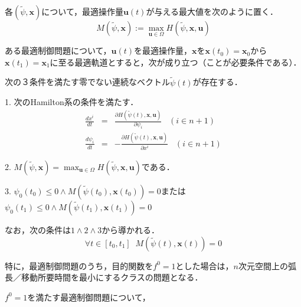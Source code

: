 \documentclass[uplatex,dvipdfmx]{jsreport}
\begin{document}
\begin{notation}
    各$(\tilde{\psi},\mathbf{x})$について，最適操作量$\mathbf{u}(t)$が与える最大値を次のように置く．
    \[ M(\tilde{\psi},\mathbf{x}):=\max_{\mathbf{u}\in\Omega}H(\tilde{\psi},\mathbf{x},\mathbf{u}) \]
\end{notation}

\begin{theorem}[Pontryagin]
    ある最適制御問題について，$\mathbf{u}(t)$を最適操作量，$\mathbf{x}$を$\mathbf{x}(t_0)=\mathbf{x}_0$から$\mathbf{x}(t_1)=\mathbf{x}_1$に至る最適軌道とすると，次が成り立つ（ことが必要条件である）．

    \begin{center}
        
        次の３条件を満たす零でない連続なベクトル$\tilde{\psi}(t)$が存在する．

    1. 次のHamilton系の条件を満たす．
    \begin{eqnarray}
        \frac{dx^i}{dt} &=& \frac{\partial H(\tilde{\psi}(t),\mathbf{x},\mathbf{u})}{\partial\psi_i}\;\;\; (i\in n+1) \\
        \frac{d\psi_i}{dt} &=& -\frac{\partial H(\tilde{\psi}(t),\mathbf{x},\mathbf{u})}{\partial x^i}\;\;\; (i\in n+1)
    \end{eqnarray}

    2. $M(\tilde{\psi},\mathbf{x})=\max_{\mathbf{u}\in\Omega}H(\tilde{\psi},\mathbf{x},\mathbf{u})$である．

    3. $\psi_0(t_0)\le 0\land M(\tilde{\psi}(t_0),\mathbf{x}(t_0))=0$または$\psi_0(t_1)\le 0\land M(\tilde{\psi}(t_1),\mathbf{x}(t_1))=0$
    \end{center}

    なお，次の条件は$1\land 2\land 3$から導かれる．
    \[ \forall t\in [t_0,t_1]\;\; M(\tilde{\psi}(t),\mathbf{x}(t))=0 \]
\end{theorem}

特に，最適制御問題のうち，目的関数を$f^0=1$とした場合は，$n$次元空間上の弧長／移動所要時間を最小にするクラスの問題となる．

\begin{corollary}
    $f^0=1$を満たす最適制御問題について，
\end{corollary}
\end{document}
